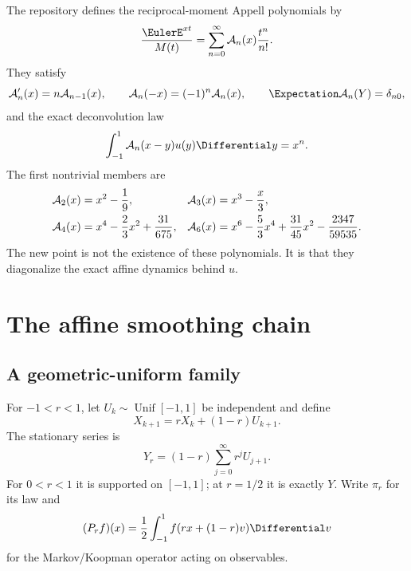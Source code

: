 \documentclass[11pt,a4paper]{article}
\theoremstyle{definition}
\theoremstyle{remark}
\newcommand{\Acal}{\mathcal A}
\begin{document}
The repository defines the reciprocal-moment Appell polynomials by
\begin{equation}
 \frac{\EulerE^{xt}}{M(t)}
 =\sum_{n=0}^{\infty}\Acal_n(x)\frac{t^n}{n!}.
 \label{eq:Appell-gen}
\end{equation}
They satisfy
\begin{equation}
 \Acal_n'(x)=n\Acal_{n-1}(x),
 \qquad
 \Acal_n(-x)=(-1)^n\Acal_n(x),
 \qquad
 \Expectation\Acal_n(Y)=\delta_{n0},
 \label{eq:Appell-basic}
\end{equation}
and the exact deconvolution law
\begin{equation}
 \int_{-1}^{1}\Acal_n(x-y)u(y)\Differential y=x^n.
 \label{eq:Appell-deconv}
\end{equation}
The first nontrivial members are
\begin{align}
 \Acal_2(x)&=x^2-\frac19,
 &\Acal_3(x)&=x^3-\frac{x}{3},
 \notag\\
 \Acal_4(x)&=x^4-\frac23x^2+\frac{31}{675},
 &\Acal_6(x)&=x^6-\frac53x^4+\frac{31}{45}x^2-\frac{2347}{59535}.
 \label{eq:Appell-low}
\end{align}
The new point is not the existence of these polynomials. It is that they diagonalize the exact affine dynamics behind $u$.

\section{The affine smoothing chain}
\label{sec:chain}

\subsection{A geometric-uniform family}

For $-1<r<1$, let $U_k\sim\operatorname{Unif}[-1,1]$ be independent and define
\begin{equation}
 X_{k+1}=rX_k+(1-r)U_{k+1}.
 \label{eq:r-chain}
\end{equation}
The stationary series is
\begin{equation}
 Y_r=(1-r)\sum_{j=0}^{\infty}r^jU_{j+1}.
 \label{eq:Yr}
\end{equation}
For $0<r<1$ it is supported on $[-1,1]$; at $r=1/2$ it is exactly $Y$. Write $\pi_r$ for its law and
\begin{equation}
 (P_rf)(x)=\frac12\int_{-1}^{1}f(rx+(1-r)v)\Differential v
 \label{eq:Pr}
\end{equation}
for the Markov/Koopman operator acting on observables.
\end{document}
